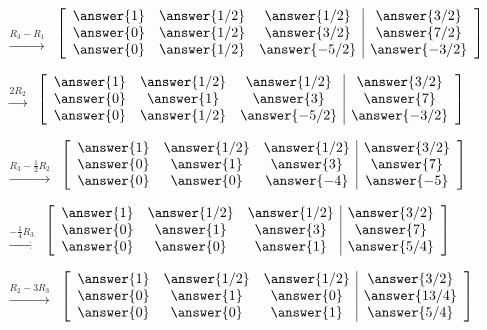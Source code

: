 \documentclass{ximera}
\begin{document}
\begin{problem}
\begin{problem}
\begin{center}
$\begin{array}{c}
  \\
\\
 \xrightarrow{R_3-R_1}
\end{array}$
$\left[\begin{array}{ccc|c}  
 \answer{1}&\answer{1/2}&\answer{1/2}&\answer{3/2}\\\answer{0}&\answer{1/2}&\answer{3/2}&\answer{7/2}\\\answer{0}&\answer{1/2}&\answer{-5/2}&\answer{-3/2}
 \end{array}\right]$
 
$ \begin{array}{c}
\\
 \xrightarrow{2R_2}\\
\\
\end{array}$
$\left[\begin{array}{ccc|c}  
 \answer{1}&\answer{1/2}&\answer{1/2}&\answer{3/2}\\\answer{0}&\answer{1}&\answer{3}&\answer{7}\\\answer{0}&\answer{1/2}&\answer{-5/2}&\answer{-3/2}
 \end{array}\right]$

$ \begin{array}{c}
\\
\\
 \xrightarrow{R_3-\frac{1}{2}R_2}
\end{array}$
$\left[\begin{array}{ccc|c}  
 \answer{1}&\answer{1/2}&\answer{1/2}&\answer{3/2}\\\answer{0}&\answer{1}&\answer{3}&\answer{7}\\\answer{0}&\answer{0}&\answer{-4}&\answer{-5}
 \end{array}\right]$


$ \begin{array}{c}
 \\
 \\
 \xrightarrow{-\frac{1}{4}R_3}
\end{array}$
$\left[\begin{array}{ccc|c}  
 \answer{1}&\answer{1/2}&\answer{1/2}&\answer{3/2}\\\answer{0}&\answer{1}&\answer{3}&\answer{7}\\\answer{0}&\answer{0}&\answer{1}&\answer{5/4}
 \end{array}\right]$
 
 
$ \begin{array}{c}
 \\
 \xrightarrow{R_2-3R_3}\\
\\
\end{array}$
$\left[\begin{array}{ccc|c}  
 \answer{1}&\answer{1/2}&\answer{1/2}&\answer{3/2}\\\answer{0}&\answer{1}&\answer{0}&\answer{13/4}\\\answer{0}&\answer{0}&\answer{1}&\answer{5/4}
 \end{array}\right]$
 

\end{center}
\end{problem}
\end{problem}
\end{document}

